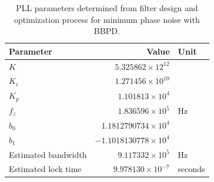 		\begin{table}[h!]
			\centering
			\def\arraystretch{1.5}		
			\setlength\arrayrulewidth{0.75pt}
			\setlength{\tabcolsep}{1em} %
			\begin{tabular}{|l|r|l|}
				\hline 
				\rule[-1ex]{0pt}{2.5ex} \cellcolor{gray!40}\textbf{Parameter} & \cellcolor{gray!40}\textbf{Value} & \cellcolor{gray!40}\textbf{Unit }\\ 
				\hline 
				\rule[-1ex]{0pt}{2.5ex} \textbf{$K$}  & $5.325862\times12^{12}$ &  \\
				\hline 
				\rule[-1ex]{0pt}{2.5ex} \textbf{$K_i$}  & $1.271456\times10^{10}$ &  \\
				\hline 
				\rule[-1ex]{0pt}{2.5ex} \textbf{$K_p$}  & $1.101813\times10^{4}$ &  \\
				\hline 
				\rule[-1ex]{0pt}{2.5ex} \textbf{$f_z$} & $1.836596\times10^5$ & Hz\\
				\hline 
				\rule[-1ex]{0pt}{2.5ex} \textbf{$b_0$}  & $1.1812790734\times10^4$  &\\
				\hline 
				\rule[-1ex]{0pt}{2.5ex} \textbf{$b_1$}  & $-1.1018130778\times10^4$  & \\
				\hline 
				\rule[-1ex]{0pt}{2.5ex} Estimated bandwidth & $9.117332\times10^5$ & Hz \\
				\hline 
				\rule[-1ex]{0pt}{2.5ex} Estimated lock time & $9.978130\times10^{-7}$ & seconds \\
				\hline 
			\end{tabular} 
			\caption{PLL parameters determined from filter design and optimization process for minimum phase noise with BBPD.}
			\label{filter_params_bbpd_low_noise}
		\end{table}   
